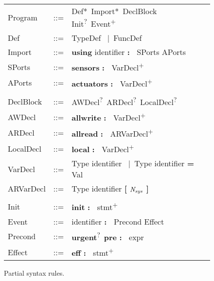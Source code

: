 \begin{figure}

\newcommand{\zeroone}{\textsuperscript{?}\ }
\newcommand{\zeromore}{*\ }
\newcommand{\onemore}{\textsuperscript{+}\ }
\newcommand{\vbar}{{\normalfont\ |\ }}
\newcommand{\mterm}[1]{{\normalfont \textbf{#1}}}
\newcommand{\delim}{\mterm{:\ }\xspace}

\itshape
\begin{tabular}{lrl}
    Program   & ::= & Def\zeromore Import\zeromore DeclBlock Init\zeroone Event\onemore \\
    Def       & ::= & TypeDef \vbar FuncDef                                             \\
    Import    & ::= & \mterm{using} identifier \delim SPorts APorts      \\
    SPorts    & ::= & \mterm{sensors} \delim VarDecl\onemore                            \\
    APorts    & ::= & \mterm{actuators} \delim VarDecl\onemore                          \\
              &     &                                                                   \\
    DeclBlock & ::= & AWDecl\zeroone ARDecl\zeroone LocalDecl\zeroone                   \\
    AWDecl    & ::= & \mterm{allwrite} \delim VarDecl\onemore                           \\
    ARDecl    & ::= & \mterm{allread} \delim ARVarDecl\onemore                          \\
    LocalDecl & ::= & \mterm{local} \delim VarDecl\onemore                              \\
    VarDecl   & ::= & Type identifier \vbar Type identifier \mterm{=} Val               \\
    ARVarDecl & ::= & Type identifier \mterm{[ $\mathit{N_{sys}}$ ]}                               \\
              &     &                                                                   \\
    Init      & ::= & \mterm{init} \delim stmt\onemore                                  \\
    Event     & ::= & identifier \delim Precond Effect                                  \\
    Precond   & ::= & \mterm{urgent}\zeroone \mterm{pre} \delim expr                    \\
    Effect    & ::= & \mterm{eff} \delim stmt\onemore
\end{tabular}

\caption{Partial \lgname syntax rules.}\label{fig:partial-syntax}
\end{figure}


